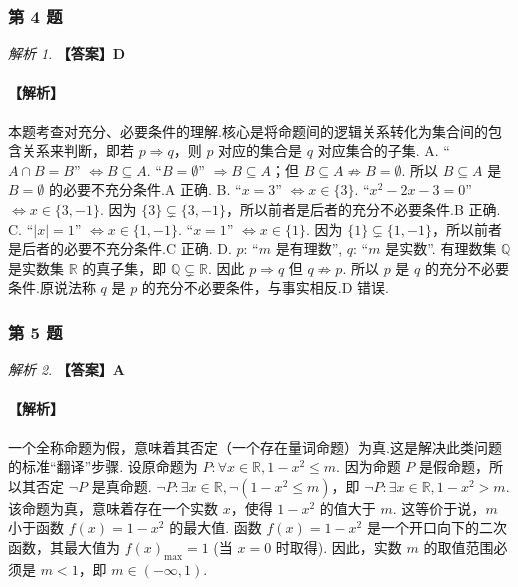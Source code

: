 \documentclass[12pt,a4paper]{ctexbook}
\theoremstyle{definition}
\theoremstyle{remark}
\newtheorem*{solution}{解析}
\begin{document}
	\subsubsection*{第 4 题}
	\begin{solution}
		\textbf{【答案】D}
		\paragraph{【解析】}
		本题考查对充分、必要条件的理解.核心是将命题间的逻辑关系转化为集合间的包含关系来判断，即若 $p \Rightarrow q$，则 $p$ 对应的集合是 $q$ 对应集合的子集.
		A. “$A \cap B = B$” $\iff B \subseteq A$. “$B=\emptyset$” $\Rightarrow B \subseteq A$；但 $B \subseteq A \not\Rightarrow B=\emptyset$. 所以 $B \subseteq A$ 是 $B=\emptyset$ 的必要不充分条件.A 正确.
		B. “$x=3$” $\iff x \in \{3\}$. “$x^2-2x-3=0$” $\iff x \in \{3, -1\}$. 因为 $\{3\} \subsetneq \{3, -1\}$，所以前者是后者的充分不必要条件.B 正确.
		C. “$|x|=1$” $\iff x \in \{1, -1\}$. “$x=1$” $\iff x \in \{1\}$. 因为 $\{1\} \subsetneq \{1, -1\}$，所以前者是后者的必要不充分条件.C 正确.
		D. $p$: “$m$ 是有理数”, $q$: “$m$ 是实数”. 有理数集 $\mathbb{Q}$ 是实数集 $\mathbb{R}$ 的真子集，即 $\mathbb{Q} \subsetneq \mathbb{R}$. 因此 $p \Rightarrow q$ 但 $q \not\Rightarrow p$. 所以 $p$ 是 $q$ 的充分不必要条件.原说法称 $q$ 是 $p$ 的充分不必要条件，与事实相反.D 错误.
	\end{solution}
	
	\subsubsection*{第 5 题}
	\begin{solution}
		\textbf{【答案】A}
		\paragraph{【解析】}
		一个全称命题为假，意味着其否定（一个存在量词命题）为真.这是解决此类问题的标准“翻译”步骤.
		设原命题为 $P: \forall x \in \mathbb{R}, 1-x^2 \le m$.
		因为命题 $P$ 是假命题，所以其否定 $\neg P$ 是真命题.
		$\neg P: \exists x \in \mathbb{R}, \neg(1-x^2 \le m)$，即 $\neg P: \exists x \in \mathbb{R}, 1-x^2 > m$.
		该命题为真，意味着存在一个实数 $x$，使得 $1-x^2$ 的值大于 $m$.
		这等价于说，$m$ 小于函数 $f(x) = 1-x^2$ 的最大值.
		函数 $f(x)=1-x^2$ 是一个开口向下的二次函数，其最大值为 $f(x)_{\max} = 1$ (当 $x=0$ 时取得).
		因此，实数 $m$ 的取值范围必须是 $m < 1$，即 $m \in (-\infty, 1)$.
	\end{solution}
	
\end{document}
